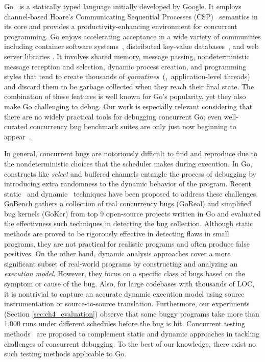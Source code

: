 Go~\cite{go} is a statically typed language initially developed by Google.
%
It employs channel-based Hoare's Communicating Sequential Processes (CSP)~\cite{hoare-csp78} semantics in its core and provides a productivity-enhancing environment for concurrent programming.
%
Go enjoys accelerating acceptance in a wide variety of
communities including container software systems~\cite{merkel2014docker,kubernetes},  distributed key-value databases~\cite{etcd,cockroachdb-sigmod20}, and web server libraries \cite{grpc}.
%
It involves shared memory, message passing, nondeterministic message reception and selection, dynamic process creation, and programming styles that tend to create thousands of \textit{goroutines}~(\ie,~application-level threads) and discard them to be garbage collected when they reach their final state.
%
The combination of these features is well known for Go's popularity, yet they also make Go challenging to debug.
%
Our work is especially relevant considering that there are no widely practical tools for debugging concurrent Go; even well-curated
concurrency bug benchmark suites are only just now beginning to appear~\cite{tu-concurrentBugs-asplos19,yuan-gobench-cgo21}.
%

In general, concurrent bugs are notoriously difficult to find and reproduce due to the nondeterministic choices that the scheduler makes during execution.
%
In Go, constructs like \textit{select} and buffered channels entangle the process of debugging by introducing extra randomness to the dynamic behavior of the program.
%
Recent static~\cite{ng-dl-cc16,stadtmuller-minigo-aplas16,lange-fence-popl17,lange-staticType-icse18} and dynamic~\cite{go-race-blog,zhao-occam97,sulzmann-corr17,sulzmann-twophase-2018,dilley-gomela-corr2020} techniques have been proposed to address these challenges.
%
GoBench \cite{yuan-gobench-cgo21} gathers a collection of real concurrency bugs (GoReal) and simplified bug kernels (GoKer) from top 9 open-source projects written in Go and evaluated the effectivness such techniques in detecting the bug collection.
%
Although static methods are proved to be rigorously effective in detecting flaws in small programs, they are not practical for realistic programs and often produce false positives.
%
On the other hand, dynamic analysis approaches cover a more significant subset of real-world programs by constructing and analyzing an \textit{execution model}.
%
However, they focus on a specific class of bugs based on the symptom or cause of the bug.
%
Also, for large codebases with thousands of LOC, it is nontrivial to capture an accurate dynamic execution model using source instrumentation or source-to-source translation.
%
Furthermore, our experiments (Section \ref{sec:ch4_evaluation}) observe that some buggy programs take more than 1,000 runs under different schedules before the bug is hit.
%
Concurrent testing methods~\cite{arora-concrrentTesting-16} are proposed to complement static and dynamic approaches in tackling challenges of concurrent debugging.
%
To the best of our knowledge, there exist no such testing methods applicable to Go.
%




